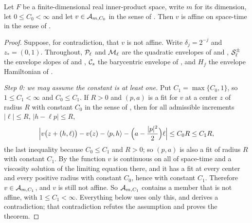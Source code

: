 \begin{theorem}
Let $F$ be a finite-dimensional real inner-product space, write $m$ for its
dimension, let $0\le C_0<\infty$ and let $v\in\mathcal{A}_{m,C_0}$ in the sense of
. Then $v$ is affine on space-time in the sense of
.
\end{theorem}
\begin{proof}
Suppose, for contradiction, that $v$ is not affine. Write $\delta_j=2^{-j}$ and
$z_*=(0,1)$. Throughout, $\mathcal{P}_\ell$ and $\mathcal{M}_\ell$ are the quadratic
envelopes of  and , $\mathcal{S}^\pm_\ell$ the
envelope slopes of  and , $\mathcal{C}_s$ the
barycentric envelope of , and $H_f$ the envelope Hamiltonian of
.

\emph{Step 0: we may assume the constant is at least one.}
Put $C_1=\max\{C_0,1\}$, so $1\le C_1<\infty$ and $C_0\le C_1$. If $R>0$ and
$(p,a)$ is a fit for $v$ at a center $z$ of radius $R$ with constant $C_0$ in
the sense of , then for all admissible increments
$|\ell|\le R$, $|h-\ell p|\le R$,
\[
  \Bigl|v\bigl(z+(h,\ell)\bigr)-v(z)-\langle p,h\rangle
     -\Bigl(a-\frac{|p|^2}{2}\Bigr)\ell\Bigr|\le C_0R\le C_1R ,
\]
the last inequality because $C_0\le C_1$ and $R>0$; so $(p,a)$ is also a fit of
radius $R$ with constant $C_1$. By  the function $v$ is continuous on all of
space-time and a viscosity solution of the limiting equation there, and it has a
fit at every center and every positive radius with constant $C_0$, hence with
constant $C_1$. Therefore $v\in\mathcal{A}_{m,C_1}$, and $v$ is still not affine.
So $\mathcal{A}_{m,C_1}$ contains a member that is not affine, with $1\le C_1<\infty$.
Everything below uses only this, and derives a contradiction; that contradiction
refutes the assumption and proves the theorem.


\end{proof}
